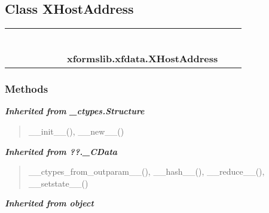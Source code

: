 \subsection{Class XHostAddress}

    \label{xformslib:xfdata:XHostAddress}
\begin{tabular}{cccccccccc}
\multicolumn{2}{r}{\settowidth{\BCL}{object}\multirow{2}{\BCL}{object}}
&&
&&
&&
  \\\cline{3-3}
  &&\multicolumn{1}{c|}{}
&&
&&
&&
  \\
\multicolumn{4}{r}{\settowidth{\BCL}{??.\_CData}\multirow{2}{\BCL}{??.\_CData}}
&&
&&
  \\\cline{5-5}
  &&&&\multicolumn{1}{c|}{}
&&
&&
  \\
\multicolumn{6}{r}{\settowidth{\BCL}{\_ctypes.Structure}\multirow{2}{\BCL}{\_ctypes.Structure}}
&&
  \\\cline{7-7}
  &&&&&&\multicolumn{1}{c|}{}
&&
  \\
&&&&&&\multicolumn{2}{l}{\textbf{xformslib.xfdata.XHostAddress}}
\end{tabular}



  \subsubsection{Methods}


\large{\textbf{\textit{Inherited from \_ctypes.Structure}}}

\begin{quote}
\_\_init\_\_(), \_\_new\_\_()
\end{quote}

\large{\textbf{\textit{Inherited from ??.\_CData}}}

\begin{quote}
\_\_ctypes\_from\_outparam\_\_(), \_\_hash\_\_(), \_\_reduce\_\_(), \_\_setstate\_\_()
\end{quote}

\large{\textbf{\textit{Inherited from object}}}

